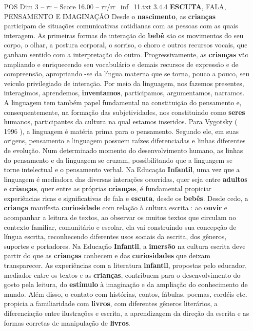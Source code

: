 \begin{textsample}{POS Dim 3 – rr – Score 16.00 – rr/rr\_inf\_11.txt}  \label{ex:f3_pos_227}
3.4.4 \textbf{ESCUTA}, FALA, PENSAMENTO E IMAGINAÇÃO Desde o \textbf{nascimento}, as \textbf{crianças} participam de situações comunicativas cotidianas com as pessoas com as quais interagem.
As primeiras formas de interação do \textbf{bebê} são os movimentos do seu corpo, o olhar, a postura corporal, o sorriso, o choro e outros recursos vocais, que ganham sentido com a interpretação do outro.
Progressivamente, as \textbf{crianças} vão ampliando e enriquecendo seu vocabulário e demais recursos de expressão e de compreensão, apropriando -se da língua materna que se torna, pouco a pouco, seu veículo privilegiado de interação.
Por meio da linguagem, nos fazemos presentes, interagimos, aprendemos, \textbf{inventamos}, participamos, argumentamos, narramos.
A linguagem tem também papel fundamental na constituição do pensamento e, consequentemente, na formação das subjetividades, nos constituindo como \textbf{seres} humanos, participantes da cultura na qual estamos inseridos.
Para Vygotsky ( 1996 ), a linguagem é matéria prima para o pensamento.
Segundo ele, em suas origens, pensamento e linguagem possuem raízes diferenciadas e linhas diferentes de evolução.
Num determinado momento do desenvolvimento humano, as linhas do pensamento e da linguagem se cruzam, possibilitando que a linguagem se torne intelectual e o pensamento verbal.
Na Educação \textbf{Infantil}, uma vez que a linguagem é mediadora das diversas interações ocorridas, quer seja entre \textbf{adultos} e \textbf{crianças}, quer entre as próprias \textbf{crianças}, é fundamental propiciar experiências ricas e significativas de fala e \textbf{escuta}, desde os \textbf{bebês}.
Desde cedo, a \textbf{criança} manifesta \textbf{curiosidade} com relação à cultura escrita : ao \textbf{ouvir} e acompanhar a leitura de textos, ao observar os muitos textos que circulam no contexto familiar, comunitário e escolar, ela vai construindo sua concepção de língua escrita, reconhecendo diferentes usos sociais da escrita, dos gêneros, suportes e portadores.
Na Educação \textbf{Infantil}, a \textbf{imersão} na cultura escrita deve partir do que as \textbf{crianças} conhecem e das \textbf{curiosidades} que deixam transparecer.
As experiências com a literatura \textbf{infantil}, propostas pelo educador, mediador entre os textos e as \textbf{crianças}, contribuem para o desenvolvimento do gosto pela leitura, do \textbf{estímulo} à imaginação e da ampliação do conhecimento de mundo.
Além disso, o contato com histórias, contos, fábulas, poemas, cordéis etc. propicia a familiaridade com \textbf{livros}, com diferentes gêneros literários, a diferenciação entre ilustrações e escrita, a aprendizagem da direção da escrita e as formas corretas de manipulação de \textbf{livros}.

\end{textsample}
